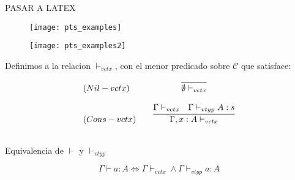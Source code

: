 PASAR A LATEX

\begin{figure}[h]
\centering
\texttt{[image: pts\_examples]}
\end{figure}

\begin{figure}[h]
\centering
\texttt{[image: pts\_examples2]}
\end{figure}

\begin{definition}
Definimos a la relacion $\vdash_{vctx}$, con el menor predicado sobre $\mathcal{C}$ que satisface:

\[
\begin{array}{llcr}
	(Nil-vctx)  & &\infer{\emptyset \vdash_{vctx}}{} \\ \\ 
	(Cons-vctx) & &\infer{\Gamma, x:A \vdash_{vctx}}{\Gamma \vdash_{vctx} & \Gamma \vdash_{vtyp} A : s} \\ \\ 
	

	
\end{array}
\]

\begin{lemma}{Equivalencia de $\vdash$ y $\vdash_{vtyp}$}

\begin{equation}
\Gamma \vdash a : A \Leftrightarrow \Gamma \vdash_{vctx} \land \Gamma \vdash_{vtyp} a:A
\end{equation}
\end{lemma}

\end{definition}
